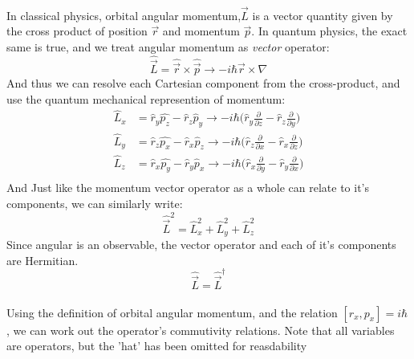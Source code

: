 \documentclass[12pt,letterpaper]{book}
\begin{document}
\paragraph*{}In classical physics, orbital angular momentum,$\vec{L}$ is a vector quantity given by the cross product of position $\vec{r}$ and momentum $\vec{p}$. In quantum physics, the exact same is true, and we treat angular momentum as \textit{vector} operator:
\begin{equation}
\label{orbit angular momentum}
\hat{\vec{L}} = \hat{\vec{r}} \times \hat{\vec{p}} \rightarrow -i\hbar \vec{r} \times \nabla
\end{equation}
And thus we can resolve each Cartesian component from the cross-product, and use the quantum mechanical represention of momentum:
\begin{equation}
\label{Lx Ly Lz}
\begin{split}
\hat{L}_x &= \hat{r}_y\hat{p_z} - \hat{r}_z\hat{p}_y \rightarrow 
-i\hbar \big(\hat{r}_y\frac{\partial}{\partial z} - \hat{r}_z\frac{\partial}{\partial y} \big) \\
\hat{L}_y &= \hat{r}_z\hat{p_x} - \hat{r}_x\hat{p}_z \rightarrow
-i\hbar \big(\hat{r}_z\frac{\partial}{\partial x} - \hat{r}_x\frac{\partial}{\partial z} \big) \\
\hat{L}_z &= \hat{r}_x\hat{p_y} - \hat{r}_y\hat{p}_x  \rightarrow
-i\hbar \big(\hat{r}_x\frac{\partial}{\partial y} - \hat{r}_y\frac{\partial}{\partial x} \big) \\
\end{split}
\end{equation}
And Just like the momentum vector operator as a whole can relate to it's components, we can similarly write:
\begin{equation}
\hat{\vec{L}}^2 = \hat{L}_x^2 + \hat{L}_y^2 + \hat{L}_z^2
\end{equation}
Since angular is an observable, the vector operator and each of it's components are Hermitian.
\begin{equation}
\hat{\vec{L}} = \hat{\vec{L}}^{\dagger}
\end{equation}

\paragraph*{}Using the definition of orbital angular momentum, and the relation $[r_x,p_x] = i\hbar$, we can work out the operator's commutivity relations. Note that all variables are operators, but the 'hat' has been omitted for reasdability
\end{document}
